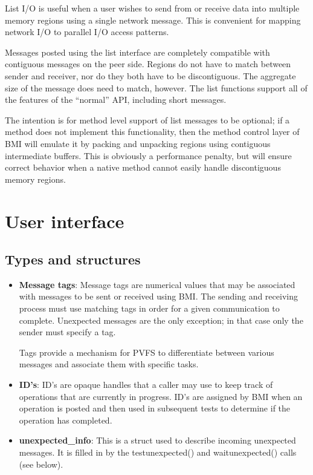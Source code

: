 \documentclass[11pt]{article}
\begin{document}
List I/O is useful when a user wishes to send from or receive data
into multiple memory regions using a single network message.  This
is convenient for mapping network I/O to parallel I/O access patterns.

Messages posted using the list interface are completely compatible
with contiguous messages on the peer side.  Regions do not have to
match between sender and receiver, nor do they both have to be
discontiguous.  The aggregate size of the message does need to
match, however.
The list functions support all of the features of the ``normal''
API, including short messages.

The intention is for method level support of list messages to be
optional; if a method does not implement this functionality, then
the method control layer of BMI will emulate it by packing and
unpacking regions using contiguous intermediate buffers.  This is
obviously a performance penalty, but will ensure correct behavior
when a native method cannot easily handle discontiguous memory
regions.

\section{User interface}
\label{sec:user}

\subsection{Types and structures}

\begin{itemize}

\item \textbf{Message tags}:  Message tags are numerical values that may
be associated with messages to be sent or received using BMI.  The
sending and receiving process must use matching tags in order for a
given communication to complete.  Unexpected messages are the only
exception; in that case only the sender must specify a tag.  

Tags provide a mechanism for PVFS to differentiate between various
messages and associate them with specific tasks.

\item \textbf{ID's}:  ID's are opaque handles that a caller may use to
keep track of operations that are currently in progress.  ID's are
assigned by BMI when an operation is posted and then used in subsequent tests
to determine if the operation has completed.

\item \textbf{unexpected\_info}: This is a struct used to
describe incoming unexpected messages.  It is filled in by the
testunexpected() and waitunexpected() calls (see below).

\end{itemize}
\end{document}
